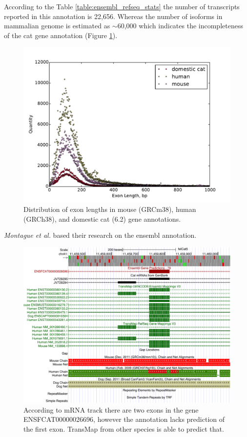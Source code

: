 \documentclass{article}
\begin{document}
According to the Table \ref{table:ensembl_refseq_stats} the number of transcripts reported in this annotation is 22{,}656. Whereas the  number of isoforms in mammalian genome is estimated as $\sim$60{,}000 which indicates the incompleteness of the cat gene annotation (Figure \ref{fig:human_mouse_cat_exons}).
\begin{figure}[h]
\centering
\includegraphics[width=\textwidth]{images/exon_distr_human_mouse_cat.pdf}
\caption{Distribution of exon lengths in mouse (GRCm38), human (GRCh38), and domestic cat (6.2) gene annotations.}
\label{fig:human_mouse_cat_exons}
\end{figure}

\textit{Montague et al.} based their research on the ensembl annotation.


\begin{figure}[h]
\centering
\includegraphics[width=\textwidth]{images/hgt_hgwdev_e926_52a620.pdf}
\caption{According to mRNA track there are two exons in the gene ENSFCAT00000026696, however the annotation lacks prediction of the first exon. TransMap from other species is able to predict that.}
\label{fig:missed_exons_mrna_1}
\end{figure}
\end{document}
